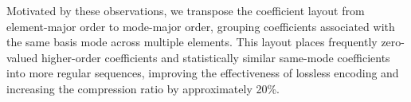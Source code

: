 Motivated by these observations, we transpose the coefficient layout from element-major order to mode-major order, grouping coefficients associated with the same basis mode across multiple elements. This layout places frequently zero-valued higher-order coefficients and statistically similar same-mode coefficients into more regular sequences, improving the effectiveness of lossless encoding and increasing the compression ratio by approximately 20\%.
